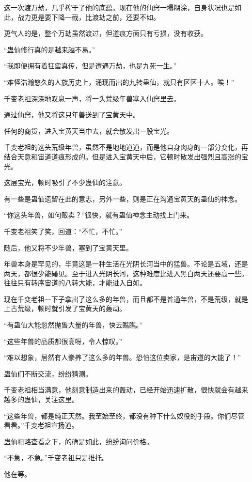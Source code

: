 \begin{this_body}
这一次渡万劫，几乎榨干了他的底蕴。现在他的仙窍一塌糊涂，自身状况也是如此，战力更是要下降一截，比渡劫之前，还要不如。

更气人的是，整个万劫虽然渡过，但道痕方面只有亏损，没有收获。

“蛊仙修行真的是越来越不易。”

“我即便拥有着狂蛮真传，但是遭遇万劫，也是九死一生。”

“难怪浩瀚悠久的人族历史上，涌现而出的九转蛊仙，就只有区区十人。唉！”

千变老祖深深地叹息一声，将一头荒级年兽塞入仙窍里去。

通过仙窍，他又将这只年兽送到了宝黄天中。

任何的商货，进入宝黄天当中去，就会散发出一股宝光。

千变老祖的这头荒级年兽，虽然不是地地道道，而是他自身肉身的一部分变化，再结合天意和宙道道痕形成的。但是进入宝黄天中后，它顿时散发出强烈且高涨的宝光。

这层宝光，顿时吸引了不少蛊仙的注意。

有一些是蛊仙遗留在此的意志，另外一些，则是正在沟通宝黄天的蛊仙的神念。

“你这头年兽，如何贩卖？”很快，就有蛊仙神念主动找上门来。

千变老祖笑了笑，回道：“不忙，不忙。”

随后，他又将不少年兽，塞到了宝黄天里。

年兽本身是罕见的，毕竟这是一种生活在光阴长河当中的猛兽。不论是五域，还是两天，都很少能碰见。至于进入光阴长河，这种难度比进入黑白两天还要高一些。往往只有转序宙道的八转大能，才能进入自如。

现在千变老祖一下子拿出了这么多的年兽，而且都不是普通年兽，不是荒级，就是上古荒级，顿时就引发了宝黄天的轰动。

“有蛊仙大能忽然抛售大量的年兽，快去瞧瞧。”

“这些年兽的品质都很高呀，令人惊叹。”

“难以想象，居然有人豢养了这么多的年兽。恐怕这位卖家，是宙道的大能了！”

蛊仙们不断交流，纷纷猜测。

千变老祖相当满意，他刻意制造出来的轰动，已经开始迅速扩散，很快就会有越来越多的蛊仙，关注这里。

“这些年兽，都是纯正天然。我至始至终，都没有种下什么奴役的手段。你们尽管看看。”千变老祖宣扬道。

蛊仙粗略查看之下，的确是如此，纷纷询问价格。

“不急，不急。”千变老祖只是推托。

他在等。


\end{this_body}
